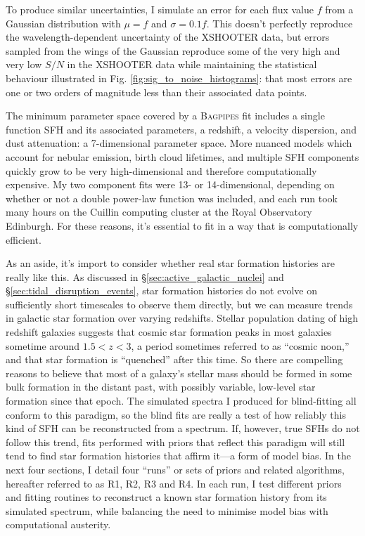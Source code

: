 \documentclass[a4paper,12pt]{article}
\begin{document}
To produce similar uncertainties, I simulate an error for each flux value $f$
from a Gaussian distribution with $\mu=f$ and $\sigma=0.1f$. This doesn't
perfectly reproduce the wavelength-dependent uncertainty of the XSHOOTER data,
but errors sampled from the wings of the Gaussian reproduce some of the very
high and very low $S/N$ in the XSHOOTER data while maintaining the statistical
behaviour illustrated in Fig. \ref{fig:sig_to_noise_histograms}: that most
errors are one or two orders of magnitude less than their associated data
points.

The minimum parameter space covered by a \textsc{Bagpipes} fit includes a
single function SFH and its associated parameters, a redshift, a velocity
dispersion, and dust attenuation: a 7-dimensional parameter space. More nuanced
models which account for nebular emission, birth cloud lifetimes, and multiple
SFH components quickly grow to be very high-dimensional and therefore
computationally expensive. My two component fits were 13- or 14-dimensional,
depending on whether or not a double power-law function was included, and each
run took many hours on the Cuillin computing cluster at the Royal Observatory
Edinburgh. For these reasons, it's essential to fit in a way that is
computationally efficient.

As an aside, it's import to consider whether real star formation histories are
really like this. As discussed in \S\ref{sec:active_galactic_nuclei} and
\S\ref{sec:tidal_disruption_events}, star formation histories do not evolve on
sufficiently short timescales to observe them directly, but we can measure
trends in galactic star formation over varying redshifts. Stellar population
dating of high redshift galaxies suggests that cosmic star formation peaks in
most galaxies sometime around $1.5 < z < 3$, a period sometimes referred to as
``cosmic noon,'' and that star formation is ``quenched'' after this
time.\cite{Feldmann_2016} So there are compelling reasons to believe that most
of a galaxy's stellar mass should be formed in some bulk formation in the
distant past, with possibly variable, low-level star formation since that
epoch. The simulated spectra I produced for blind-fitting all conform to this
paradigm, so the blind fits are really a test of how reliably this kind of SFH
can be reconstructed from a spectrum. If, however, true SFHs do not follow this
trend, fits performed with priors that reflect this paradigm will still tend to
find star formation histories that affirm it---a form of model bias. In the
next four sections, I detail four ``runs'' or sets of priors and related
algorithms, hereafter referred to as R1, R2, R3 and R4. In each run, I test
different priors and fitting routines to reconstruct a known star formation
history from its simulated spectrum, while balancing the need to minimise model
bias with computational austerity.
\end{document}
